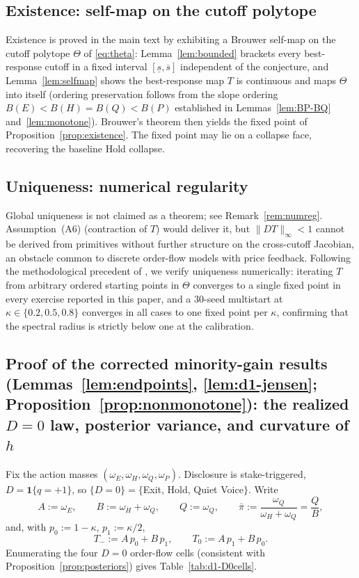 \documentclass[11pt]{article}
\newcommand{\1}{\mathbf{1}}
\providecommand{\Tmap}{T}
\begin{document}
\subsection{Existence: self-map on the cutoff polytope}
\label{app:proof-existence}

Existence is proved in the main text by exhibiting a Brouwer self-map on the cutoff polytope $\Theta$ of \eqref{eq:theta}: Lemma~\ref{lem:bounded} brackets every best-response cutoff in a fixed interval $[\underline{s},\overline{s}]$ independent of the conjecture, and Lemma~\ref{lem:selfmap} shows the best-response map $\Tmap$ is continuous and maps $\Theta$ into itself (ordering preservation follows from the slope ordering $B(E)<B(H)=B(Q)<B(P)$ established in Lemmas~\ref{lem:BP-BQ} and~\ref{lem:monotone}). Brouwer's theorem then yields the fixed point of Proposition~\ref{prop:existence}. The fixed point may lie on a collapse face, recovering the baseline Hold collapse.

\subsection{Uniqueness: numerical regularity}
\label{app:proof-uniqueness}

Global uniqueness is not claimed as a theorem; see Remark~\ref{rem:numreg}. Assumption~\textup{(A6)} (contraction of $\Tmap$) would deliver it, but $\|D\Tmap\|_\infty<1$ cannot be derived from primitives without further structure on the cross-cutoff Jacobian, an obstacle common to discrete order-flow models with price feedback. Following the methodological precedent of \citet{EdmansGoldsteinJiang2015}, we verify uniqueness numerically: iterating $\Tmap$ from arbitrary ordered starting points in $\Theta$ converges to a single fixed point in every exercise reported in this paper, and a $30$-seed multistart at $\kappa\in\{0.2,0.5,0.8\}$ converges in all cases to one fixed point per $\kappa$, confirming that the spectral radius is strictly below one at the calibration.

\subsection{Proof of the corrected minority-gain results (Lemmas~\ref{lem:endpoints}, \ref{lem:d1-jensen}; Proposition~\ref{prop:nonmonotone}): the realized $D=0$ law, posterior variance, and curvature of $h$}
\label{app:proof-d1-variance}

Fix the action masses $(\omega_E,\omega_H,\omega_Q,\omega_P)$. Disclosure is
stake-triggered, $D=\1\{q=+1\}$, so $\{D=0\}=\{$Exit, Hold, Quiet Voice$\}$.
Write
\[
  A:=\omega_E,\qquad B:=\omega_H+\omega_Q,\qquad Q:=\omega_Q,\qquad
  \bar\pi:=\frac{\omega_Q}{\omega_H+\omega_Q}=\frac{Q}{B},
\]
and, with $p_0:=1-\kappa$, $p_1:=\kappa/2$,
\[
  T_-:=A\,p_0+B\,p_1,\qquad T_0:=A\,p_1+B\,p_0 .
\]
Enumerating the four $D=0$ order-flow cells (consistent with
Proposition~\ref{prop:posteriors}) gives Table~\ref{tab:d1-D0cells}.
\end{document}
